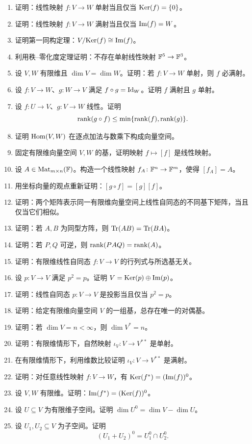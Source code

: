 \begin{enumerate}[label=\textbf{\arabic*.}, leftmargin=3.5em, start=31]
  \item {\medium} 证明：线性映射 $f\colon V\to W$ 单射当且仅当 $\mathrm{Ker}(f)=\{0\}$。
  \item {\medium} 证明：线性映射 $f\colon V\to W$ 满射当且仅当 $\mathrm{Im}(f)=W$。
  \item {\medium} 证明第一同构定理：$V/\mathrm{Ker}(f)\cong \mathrm{Im}(f)$。
  \item {\medium} 利用秩--零化度定理证明：不存在单射线性映射 $\mathbb{F}^5\to\mathbb{F}^3$。
  \item {\medium} 设 $V,W$ 有限维且 $\dim V=\dim W$。证明：若 $f\colon V\to W$ 单射，则 $f$ 必满射。
  \item {\medium} 设 $f\colon V\to W$、$g\colon W\to V$ 满足 $f\circ g=\mathrm{Id}_W$。证明 $f$ 满射且 $g$ 单射。
  \item {\medium} 设 $f\colon U\to V$、$g\colon V\to W$ 线性。证明
  \[
    \operatorname{rank}(g\circ f)\le \min\{\operatorname{rank}(f),\operatorname{rank}(g)\}.
  \]
  \item {\medium} 证明 $\mathrm{Hom}(V,W)$ 在逐点加法与数乘下构成向量空间。
  \item {\medium} 固定有限维向量空间 $V,W$ 的基，证明映射 $f\mapsto [f]$ 是线性映射。
  \item {\medium} 设 $A\in\mathrm{Mat}_{m\times n}(\mathbb{F})$。构造一个线性映射 $f_A\colon \mathbb{F}^n\to\mathbb{F}^m$，使得 $[f_A]=A$。
  \item {\medium} 用坐标向量的观点重新证明：$[g\circ f]=[g][f]$。
  \item {\medium} 证明：两个矩阵表示同一有限维向量空间上线性自同态的不同基下矩阵，当且仅当它们相似。
  \item {\medium} 证明：若 $A,B$ 为同型方阵，则 $\mathrm{Tr}(AB)=\mathrm{Tr}(BA)$。
  \item {\medium} 证明：若 $P,Q$ 可逆，则 $\operatorname{rank}(PAQ)=\operatorname{rank}(A)$。
  \item {\medium} 证明：有限维线性自同态 $f\colon V\to V$ 的行列式与所选基无关。
  \item {\medium} 设 $p\colon V\to V$ 满足 $p^2=p$。证明 $V=\mathrm{Ker}(p)\oplus\mathrm{Im}(p)$。
  \item {\medium} 证明：线性自同态 $p\colon V\to V$ 是投影当且仅当 $p^2=p$。
  \item {\medium} 证明：给定有限维向量空间 $V$ 的一组基，总存在唯一的对偶基。
  \item {\medium} 证明：若 $\dim V=n<\infty$，则 $\dim V^*=n$。
  \item {\medium} 证明：有限维情形下，自然映射 $\iota_V\colon V\to V^{**}$ 是单射。
  \item {\medium} 在有限维情形下，利用维数比较证明 $\iota_V\colon V\to V^{**}$ 是满射。
  \item {\medium} 证明：对任意线性映射 $f\colon V\to W$，有 $\mathrm{Ker}(f^*)=(\mathrm{Im}(f))^0$。
  \item {\medium} 设 $V,W$ 有限维。证明：$\mathrm{Im}(f^*)=(\mathrm{Ker}(f))^0$。
  \item {\medium} 设 $U\subseteq V$ 为有限维子空间。证明 $\dim U^0=\dim V-\dim U$。
  \item {\medium} 设 $U_1,U_2\subseteq V$ 为子空间。证明
  \[
    (U_1+U_2)^0=U_1^0\cap U_2^0.
  \]
\end{enumerate}


